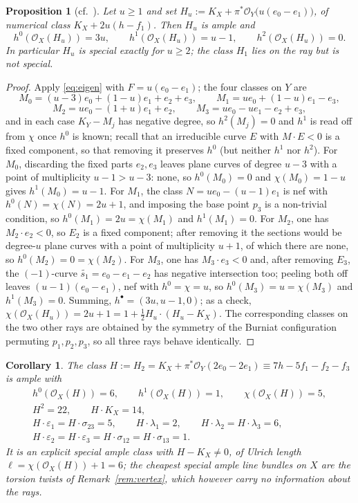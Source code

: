 \documentclass{amsart}
\newtheorem{proposition}[theorem]{Proposition}
\newtheorem{corollary}[theorem]{Corollary}
\theoremstyle{definition}
\newcommand{\OO}{\mathcal{O}}
\newcommand{\len}{\ell}
\begin{document}
\begin{proposition}[cf.\ {\cite[Prop.~4.27]{Cho26}}]\label{prop:ray}
Let $u\ge1$ and set $H_u:=K_X+\pi^*\OO_Y\bigl(u(e_0-e_1)\bigr)$, of numerical class $K_X+2u(h-f_1)$. Then $H_u$ is ample and
\[
h^0(\OO_X(H_u))=3u,\qquad h^1(\OO_X(H_u))=u-1,\qquad h^2(\OO_X(H_u))=0 .
\]
In particular $H_u$ is special exactly for $u\ge2$; the class $H_1$ lies on the ray but is not special.
\end{proposition}

\begin{proof}
Apply \eqref{eq:eigen} with $F=u(e_0-e_1)$; the four classes on $Y$ are
\[
M_0=(u-3)e_0+(1-u)e_1+e_2+e_3,\qquad M_1=ue_0+(1-u)e_1-e_3,
\]
\[
M_2=ue_0-(1+u)e_1+e_2,\qquad M_3=ue_0-ue_1-e_2+e_3,
\]
and in each case $K_Y-M_j$ has negative degree, so $h^2(M_j)=0$ and $h^1$ is read off from $\chi$ once $h^0$ is known; recall that an irreducible curve $E$ with $M\cdot E<0$ is a fixed component, so that removing it preserves $h^0$ (but neither $h^1$ nor $h^2$). For $M_0$, discarding the fixed parts $e_2,e_3$ leaves plane curves of degree $u-3$ with a point of multiplicity $u-1>u-3$: none, so $h^0(M_0)=0$ and $\chi(M_0)=1-u$ gives $h^1(M_0)=u-1$. For $M_1$, the class $N=ue_0-(u-1)e_1$ is nef with $h^0(N)=\chi(N)=2u+1$, and imposing the base point $p_3$ is a non-trivial condition, so $h^0(M_1)=2u=\chi(M_1)$ and $h^1(M_1)=0$. For $M_2$, one has $M_2\cdot e_2<0$, so $E_2$ is a fixed component; after removing it the sections would be degree-$u$ plane curves with a point of multiplicity $u+1$, of which there are none, so $h^0(M_2)=0=\chi(M_2)$. For $M_3$, one has $M_3\cdot e_3<0$ and, after removing $E_3$, the $(-1)$-curve $\widetilde{s_1}=e_0-e_1-e_2$ has negative intersection too; peeling both off leaves $(u-1)(e_0-e_1)$, nef with $h^0=\chi=u$, so $h^0(M_3)=u=\chi(M_3)$ and $h^1(M_3)=0$. Summing, $h^\bullet=(3u,u-1,0)$; as a check, $\chi(\OO_X(H_u))=2u+1=1+\tfrac12H_u\cdot(H_u-K_X)$. The corresponding classes on the two other rays are obtained by the symmetry of the Burniat configuration permuting $p_1,p_2,p_3$, so all three rays behave identically.
\end{proof}

\begin{corollary}\label{cor:candidate}
The class $H:=H_2=K_X+\pi^*\OO_Y(2e_0-2e_1)\equiv7h-5f_1-f_2-f_3$ is ample with
\begin{gather*}
h^0(\OO_X(H))=6,\qquad h^1(\OO_X(H))=1,\qquad \chi(\OO_X(H))=5,\\
H^2=22,\qquad H\cdot K_X=14,\\
H\cdot\varepsilon_1=H\cdot\sigma_{23}=5,\qquad
H\cdot\lambda_1=2,\qquad H\cdot\lambda_2=H\cdot\lambda_3=6,\\
H\cdot\varepsilon_2=H\cdot\varepsilon_3=H\cdot\sigma_{12}=H\cdot\sigma_{13}=1 .
\end{gather*}
It is an explicit special ample class with $H-K_X\neq0$, of Ulrich length $\len=\chi(\OO_X(H))+1=6$; the cheapest special ample line bundles on $X$ are the torsion twists of Remark~\ref{rem:vertex}, which however carry no information about the rays.
\end{corollary}
\end{document}

